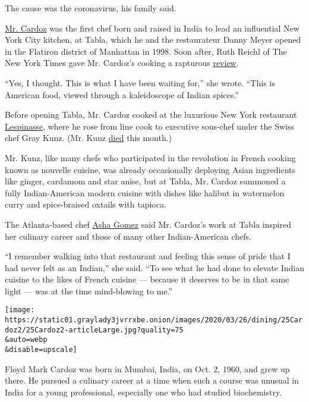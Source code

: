 The cause was the coronavirus, his family said.

\href{https://www.youtube.com/watch?v=9l2vGEQHT1M}{Mr. Cardoz} was the
first chef born and raised in India to lead an influential New York City
kitchen, at Tabla, which he and the restaurateur Danny Meyer opened in
the Flatiron district of Manhattan in 1998. Soon after, Ruth Reichl of
The New York Times gave Mr. Cardoz's cooking a rapturous
\href{https://www.nytimes3xbfgragh.onion/1999/02/24/dining/restaurants-american-food-indian-spices.html}{review}.

``Yes, I thought. This is what I have been waiting for,'' she wrote.
``This is American food, viewed through a kaleidoscope of Indian
spices.''

Before opening Tabla, Mr. Cardoz cooked at the luxurious New York
restaurant
\href{https://www.nytimes3xbfgragh.onion/2003/04/11/nyregion/a-gilded-age-of-sumptuous-dining-comes-to-a-close-in-the-st-regis-hotel.html}{Lespinasse},
where he rose from line cook to executive sous-chef under the Swiss chef
Gray Kunz. (Mr. Kunz
\href{https://www.nytimes3xbfgragh.onion/2020/03/06/obituaries/gray-kunz-dead.html?searchResultPosition=1}{died}
this month.)

Mr. Kunz, like many chefs who participated in the revolution in French
cooking known as nouvelle cuisine, was already occasionally deploying
Asian ingredients like ginger, cardamom and star anise, but at Tabla,
Mr. Cardoz summoned a fully Indian-American modern cuisine with dishes
like halibut in watermelon curry and spice-braised oxtails with tapioca.

The Atlanta-based chef
\href{https://www.nytimes3xbfgragh.onion/2017/06/06/dining/chef-asha-gomez-india.html}{Asha
Gomez} said Mr. Cardoz's work at Tabla inspired her culinary career and
those of many other Indian-American chefs.

``I remember walking into that restaurant and feeling this sense of
pride that I had never felt as an Indian,'' she said. ``To see what he
had done to elevate Indian cuisine to the likes of French cuisine ---
because it deserves to be in that same light --- was at the time
mind-blowing to me.''

\texttt{[image: https://static01.graylady3jvrrxbe.onion/images/2020/03/26/dining/25Cardoz2/25Cardoz2-articleLarge.jpg?quality=75\\\&auto=webp\\\&disable=upscale]}

Floyd Mark Cardoz was born in Mumbai, India, on Oct. 2, 1960, and grew
up there. He pursued a culinary career at a time when such a course was
unusual in India for a young professional, especially one who had
studied biochemistry.

